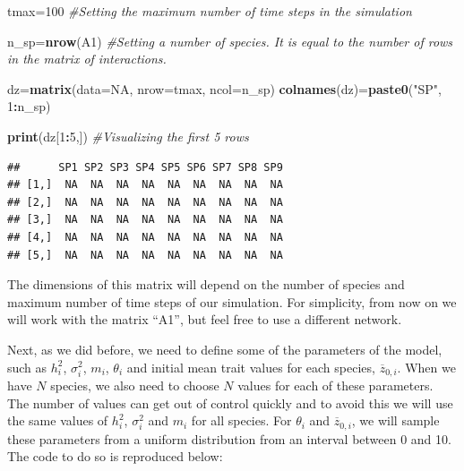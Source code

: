 \documentclass[
]{book}
\newenvironment{Shaded}{\begin{snugshade}}{\end{snugshade}}
\newcommand{\AttributeTok}[1]{\textcolor[rgb]{0.13,0.29,0.53}{#1}}
\newcommand{\CommentTok}[1]{\textcolor[rgb]{0.56,0.35,0.01}{\textit{#1}}}
\newcommand{\ConstantTok}[1]{\textcolor[rgb]{0.56,0.35,0.01}{#1}}
\newcommand{\DecValTok}[1]{\textcolor[rgb]{0.00,0.00,0.81}{#1}}
\newcommand{\FunctionTok}[1]{\textcolor[rgb]{0.13,0.29,0.53}{\textbf{#1}}}
\newcommand{\NormalTok}[1]{#1}
\newcommand{\OtherTok}[1]{\textcolor[rgb]{0.56,0.35,0.01}{#1}}
\newcommand{\SpecialCharTok}[1]{\textcolor[rgb]{0.81,0.36,0.00}{\textbf{#1}}}
\newcommand{\StringTok}[1]{\textcolor[rgb]{0.31,0.60,0.02}{#1}}
\begin{document}
\begin{Shaded}
\begin{Highlighting}[]
\NormalTok{tmax}\OtherTok{=}\DecValTok{100} \CommentTok{\#Setting the maximum number of time steps in the simulation}

\NormalTok{n\_sp}\OtherTok{=}\FunctionTok{nrow}\NormalTok{(A1) }\CommentTok{\#Setting a number of species. It is equal to the number of rows in the matrix of interactions.}

\NormalTok{dz}\OtherTok{=}\FunctionTok{matrix}\NormalTok{(}\AttributeTok{data=}\ConstantTok{NA}\NormalTok{, }\AttributeTok{nrow=}\NormalTok{tmax, }\AttributeTok{ncol=}\NormalTok{n\_sp)}
\FunctionTok{colnames}\NormalTok{(dz)}\OtherTok{=}\FunctionTok{paste0}\NormalTok{(}\StringTok{"SP"}\NormalTok{, }\DecValTok{1}\SpecialCharTok{:}\NormalTok{n\_sp)}

\FunctionTok{print}\NormalTok{(dz[}\DecValTok{1}\SpecialCharTok{:}\DecValTok{5}\NormalTok{,]) }\CommentTok{\#Visualizing the first 5 rows}
\end{Highlighting}
\end{Shaded}

\begin{verbatim}
##      SP1 SP2 SP3 SP4 SP5 SP6 SP7 SP8 SP9
## [1,]  NA  NA  NA  NA  NA  NA  NA  NA  NA
## [2,]  NA  NA  NA  NA  NA  NA  NA  NA  NA
## [3,]  NA  NA  NA  NA  NA  NA  NA  NA  NA
## [4,]  NA  NA  NA  NA  NA  NA  NA  NA  NA
## [5,]  NA  NA  NA  NA  NA  NA  NA  NA  NA
\end{verbatim}

The dimensions of this matrix will depend on the number of species and maximum number of time steps of our simulation. For simplicity, from now on we will work with the matrix ``A1'', but feel free to use a different network.

Next, as we did before, we need to define some of the parameters of the model, such as \(h^2_{i}\), \(\sigma^2_{i}\), \(m_{i}\), \(\theta_{i}\) and initial mean trait values for each species, \(\overline{z}_{0,i}\). When we have \(N\) species, we also need to choose \(N\) values for each of these parameters. The number of values can get out of control quickly and to avoid this we will use the same values of \(h^2_{i}\), \(\sigma^2_{i}\) and \(m_{i}\) for all species. For \(\theta_{i}\) and \(\overline{z}_{0,i}\), we will sample these parameters from a uniform distribution from an interval between 0 and 10. The code to do so is reproduced below:
\end{document}
